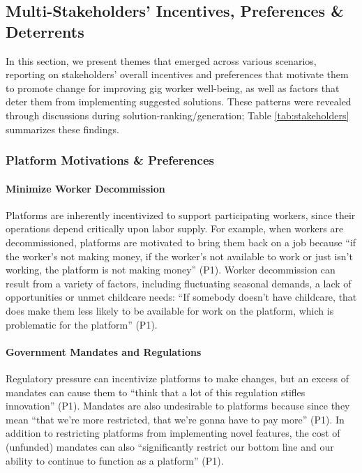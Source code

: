 \subsection{Multi-Stakeholders' Incentives, Preferences \& Deterrents}

In this section, we present themes that emerged across various scenarios, reporting on stakeholders' overall incentives and preferences that motivate them to promote change for improving gig worker well-being, as well as factors that deter them from implementing suggested solutions. These patterns were revealed through discussions during solution-ranking/generation; Table \ref{tab:stakeholders} summarizes these findings. 

\subsubsection{Platform Motivations \& Preferences}
\paragraph{Minimize Worker Decommission}
Platforms are inherently incentivized to support participating workers, since their operations depend critically upon labor supply. 
For example, when workers are decommissioned, platforms are motivated to bring them back on a job because ``if the worker's not making money, if the worker's not available to work or just isn't working, the platform is not making money'' (P1). 
Worker decommission can result from a variety of factors, including fluctuating seasonal demands, a lack of opportunities or unmet childcare needs: ``If somebody doesn't have childcare, that does make them less likely to be available for work on the platform, which is problematic for the platform'' (P1). 

\paragraph{Government Mandates and Regulations}
Regulatory pressure can incentivize platforms to make changes, but an excess of mandates can cause them to ``think that a lot of this regulation stifles innovation'' (P1). Mandates are also undesirable to platforms because since they mean ``that we're more restricted, that we're gonna have to pay more'' (P1). In addition to restricting platforms from implementing novel features, the cost of (unfunded) mandates can also ``significantly restrict our bottom line and our ability to continue to function as a platform'' (P1).

